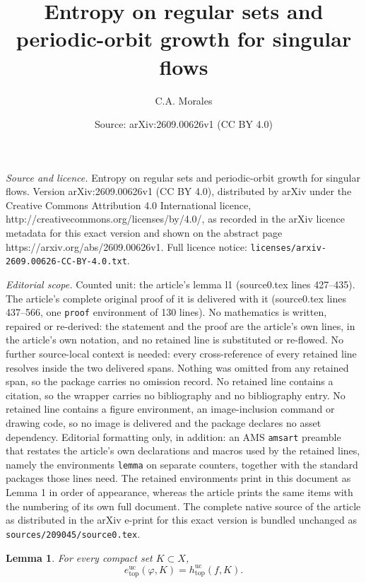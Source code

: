 \documentclass[10pt,a4paper]{amsart}
\title{Entropy on regular sets and periodic-orbit growth for singular flows}
\author{C.A. Morales}
\date{Source: arXiv:2609.00626v1 (CC BY 4.0)}
\newtheorem{lemma}{Lemma}
\newcommand{\hE}{e^{\mathrm{uc}}_{\mathrm{top}}}
\newcommand{\huc}{h^{\mathrm{uc}}_{\mathrm{top}}}
\begin{document}
\maketitle

\noindent\emph{Source and licence.} Entropy on regular sets and periodic-orbit growth for singular flows. Version arXiv:2609.00626v1 (CC BY 4.0), distributed by arXiv under the Creative Commons Attribution 4.0 International licence, http://creativecommons.org/licenses/by/4.0/, as recorded in the arXiv licence metadata for this exact version and shown on the abstract page https://arxiv.org/abs/2609.00626v1. Full licence notice: \texttt{licenses/arxiv-2609.00626-CC-BY-4.0.txt}.\par\smallskip

\noindent\textit{Editorial scope.} Counted unit: the article's lemma l1 (source0.tex lines 427--435). The article's complete original proof of it is delivered with it (source0.tex lines 437--566, one \texttt{proof} environment of 130 lines). No mathematics is written, repaired or re-derived: the statement and the proof are the article's own lines, in the article's own notation, and no retained line is substituted or re-flowed.  No further source-local context is needed: every cross-reference of every retained line resolves inside the two delivered spans.  Nothing was omitted from any retained span, so the package carries no omission record.  No retained line contains a citation, so the wrapper carries no bibliography and no bibliography entry.  No retained line contains a figure environment, an image-inclusion command or drawing code, so no image is delivered and the package declares no asset dependency.  Editorial formatting only, in addition: an AMS \texttt{amsart} preamble that restates the article's own declarations and macros used by the retained lines, namely the environments \texttt{lemma} on separate counters, together with the standard packages those lines need.  The retained environments print in this document as Lemma 1 in order of appearance, whereas the article prints the same items with the numbering of its own full document.  The complete native source of the article as distributed in the arXiv e-print for this exact version is bundled unchanged as \texttt{sources/209045/source0.tex}.
\begin{lemma}
\label{l1}
For every compact set $K\subset X$,
\[
\hE(\varphi,K)
=
\huc(f,K).
\]
\end{lemma}
\end{document}
